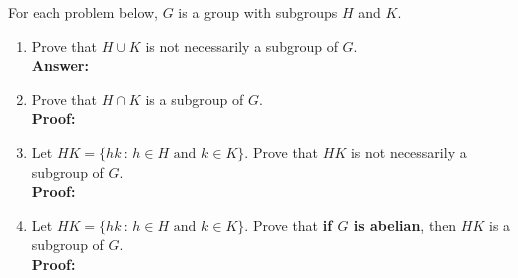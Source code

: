 \documentclass[12pt]{article}
\renewcommand{\emph}[1]{\textsf{\textbf{#1}}}
\begin{document}
For each problem below, $G$ is a group with subgroups $H$ and $K.$\\
\begin{enumerate}
\item  Prove that $H \cup K$ is not necessarily a subgroup of $G.$\\
\textbf{Answer:}\\
\item Prove that $H \cap K$ is a subgroup of $G.$\\
\textbf{Proof:}\\
\item Let $HK=\{hk \, : \, h \in H \text{ and } k \in K \}.$ Prove that $HK$ is not necessarily a subgroup of $G.$\\
\textbf{Proof:}\\
\item Let $HK=\{hk \, : \, h \in H \text{ and } k \in K \}.$ Prove that \emph{if $G$ is abelian}, then $HK$ is  a subgroup of $G.$\\
\textbf{Proof:}\\
\end{enumerate}
\end{document}

